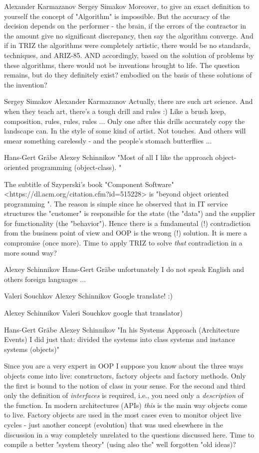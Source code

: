 \documentclass[11pt,a4paper]{article}
\begin{document}
Alexander Karmazanov Sergey Simakov Moreover, to give an exact definition to
yourself the concept of "Algorithm" is impossible. But the accuracy of the
decision depends on the performer - the brain, if the errors of the contractor
in the amount give no significant discrepancy, then say the algorithm
converge. And if in TRIZ the algorithms were completely artistic, there would
be no standards, techniques, and ARIZ-85. AND accordingly, based on the
solution of problems by these algorithms, there would not be inventions
brought to life. The question remains, but do they definitely exist?  embodied
on the basis of these solutions of the invention?

Sergey Simakov Alexander Karmazanov Actually, there are such art science. And
when they teach art, there’s a tough drill and rules :) Like a brush keep,
composition, rules, rules, rules ... Only one after this drills accurately
copy the landscape can. In the style of some kind of artist. Not touches. And
others will smear something carelessly - and the people’s stomach butterflies
...

Hans-Gert Gräbe Alexey Schinnikov "Most of all I like the approach
object-oriented programming (object-class). "

The subtitle of Szyperski's book "Component Software"
<https://dl.acm.org/citation.cfm?id=515228> is "beyond object oriented
programming ". The reason is simple since he observed that in IT service
structures the "customer" is responsible for the state (the "data") and the
supplier for functionality (the "behavior"). Hence there is a fundamental (!)
contradiction from the business point of view and OOP is the wrong (!)
solution. It is mere a compromise (once more). Time to apply TRIZ to solve
\emph{that} contradiction in a more sound way?

Alexey Schinnikov Hans-Gert Gräbe unfortunately I do not speak English and
others foreign languages ...

Valeri Souchkov Alexey Schinnikov Google translate! :)

Alexey Schinnikov Valeri Souchkov google that translator)

Hans-Gert Gräbe Alexey Schinnikov "In his Systems Approach (Architecture
Events) I did just that: divided the systems into class systems and instance
systems (objects)"

Since you are a very expert in OOP I suppose you know about the three ways
objects come into live: constructors, factory objects and factory methods.
Only the first is bound to the notion of class in your sense. For the second
and third only the definition of \emph {interfaces} is required, i.e., you
need only a \emph {description} of the function. In modern architectures
(APIs) \emph {this} is the main way objects come to live. Factory objects are
used in the most cases even to monitor object live cycles - just another
concept (evolution) that was used elsewhere in the discussion in a way
completely unrelated to the questions discussed here. Time to compile a better
"system theory" (using also the" well forgotten "old ideas)?

\ccnotice
\end{document}
